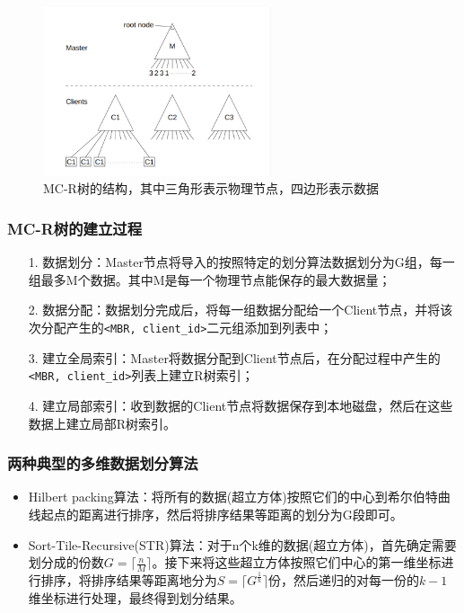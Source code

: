\documentclass{elegantpaper}
\begin{document}
\begin{figure}[!ht]
    \centering
    \includegraphics[width=0.6\textwidth]{figure/MC-Rtree.png}
    \caption{MC-R树的结构，其中三角形表示物理节点，四边形表示数据}
\end{figure}

\subsubsection{MC-R树的建立过程}

\begin{itemize}
    
    \item[1.] 数据划分：Master节点将导入的按照特定的划分算法数据划分为G组，每一组最多M个数据。其中M是每一个物理节点能保存的最大数据量；
    
    \item[2.] 数据分配：数据划分完成后，将每一组数据分配给一个Client节点，并将该次分配产生的\verb|<MBR, client_id>|二元组添加到列表中；
  
    \item[3.] 建立全局索引：Master将数据分配到Client节点后，在分配过程中产生的\verb|<MBR, client_id>|列表上建立R树索引；
    
    \item[4.] 建立局部索引：收到数据的Client节点将数据保存到本地磁盘，然后在这些数据上建立局部R树索引。
 
\end{itemize}

\subsubsection{两种典型的多维数据划分算法}

\begin{itemize}
    
    \item Hilbert packing算法：将所有的数据(超立方体)按照它们的中心到希尔伯特曲线起点的距离进行排序，然后将排序结果等距离的划分为G段即可。

    \item Sort-Tile-Recursive(STR)算法：对于n个k维的数据(超立方体)，首先确定需要划分成的份数$G = \lceil \frac{n}{M} \rceil$。接下来将这些超立方体按照它们中心的第一维坐标进行排序，将排序结果等距离地分为$S = \lceil G^{\frac{1}{k}} \rceil$份，然后递归的对每一份的$k - 1$维坐标进行处理，最终得到划分结果。

\end{itemize}
\end{document}

